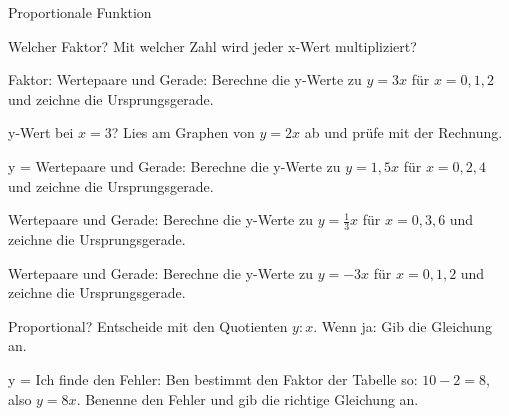 \setcounter{aufgabe}{8}

\begin{aufgabe}{Proportionale Funktion}
\begin{teile}
\teil Welcher Faktor? Mit welcher Zahl wird jeder x-Wert multipliziert?

Faktor: \leerfeld
\teil Wertepaare und Gerade: Berechne die y-Werte zu $y = 3x$ für $x = 0, 1, 2$ und zeichne die Ursprungsgerade.

\begin{ksys}[xmin=-1,xmax=3,ymin=-1,ymax=7] \end{ksys}
\teil y-Wert bei $x = 3$? Lies am Graphen von $y = 2x$ ab und prüfe mit der Rechnung.

\begin{ksys}[xmin=-1,xmax=5,ymin=-1,ymax=8,ablesen]  \end{ksys}
y = \leerfeld
\teil Wertepaare und Gerade: Berechne die y-Werte zu $y = 1{,}5x$ für $x = 0, 2, 4$ und zeichne die Ursprungsgerade.

\begin{ksys}[xmin=-1,xmax=5,ymin=-1,ymax=7] \end{ksys}
\teil Wertepaare und Gerade: Berechne die y-Werte zu $y = \frac{1}{3}x$ für $x = 0, 3, 6$ und zeichne die Ursprungsgerade.

\begin{ksys}[xmin=-1,xmax=7,ymin=-1,ymax=3] \end{ksys}
\teil Wertepaare und Gerade: Berechne die y-Werte zu $y = -3x$ für $x = 0, 1, 2$ und zeichne die Ursprungsgerade.

\begin{ksys}[xmin=-1,xmax=3,ymin=-7,ymax=1] \end{ksys}
\teil Proportional? Entscheide mit den Quotienten $y : x$. Wenn ja: Gib die Gleichung an.

\janein \quad y = \leerfeld
\teil Ich finde den Fehler: Ben bestimmt den Faktor der Tabelle so: $10 - 2 = 8$, also $y = 8x$. Benenne den Fehler und gib die richtige Gleichung an.


\end{teile}
\end{aufgabe}
